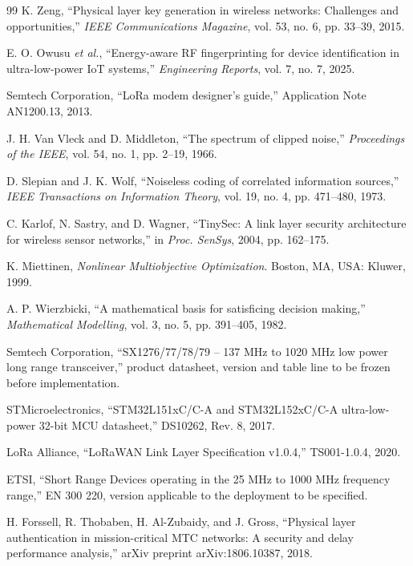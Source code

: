 \documentclass[conference,a4paper]{IEEEtran}
\begin{document}
\begin{thebibliography}{99}
K. Zeng, ``Physical layer key generation in wireless networks: Challenges and opportunities,'' \emph{IEEE Communications Magazine}, vol. 53, no. 6, pp. 33--39, 2015.

E. O. Owusu \emph{et al.}, ``Energy-aware RF fingerprinting for device identification in ultra-low-power IoT systems,'' \emph{Engineering Reports}, vol. 7, no. 7, 2025.

Semtech Corporation, ``LoRa modem designer's guide,'' Application Note AN1200.13, 2013.

J. H. Van Vleck and D. Middleton, ``The spectrum of clipped noise,'' \emph{Proceedings of the IEEE}, vol. 54, no. 1, pp. 2--19, 1966.

D. Slepian and J. K. Wolf, ``Noiseless coding of correlated information sources,'' \emph{IEEE Transactions on Information Theory}, vol. 19, no. 4, pp. 471--480, 1973.

C. Karlof, N. Sastry, and D. Wagner, ``TinySec: A link layer security architecture for wireless sensor networks,'' in \emph{Proc. SenSys}, 2004, pp. 162--175.

K. Miettinen, \emph{Nonlinear Multiobjective Optimization}. Boston, MA, USA: Kluwer, 1999.

A. P. Wierzbicki, ``A mathematical basis for satisficing decision making,'' \emph{Mathematical Modelling}, vol. 3, no. 5, pp. 391--405, 1982.

Semtech Corporation, ``SX1276/77/78/79 -- 137 MHz to 1020 MHz low power long range transceiver,'' product datasheet, version and table line to be frozen before implementation.

STMicroelectronics, ``STM32L151xC/C-A and STM32L152xC/C-A ultra-low-power 32-bit MCU datasheet,'' DS10262, Rev. 8, 2017.

LoRa Alliance, ``LoRaWAN Link Layer Specification v1.0.4,'' TS001-1.0.4, 2020.

ETSI, ``Short Range Devices operating in the 25 MHz to 1000 MHz frequency range,'' EN 300 220, version applicable to the deployment to be specified.


H. Forssell, R. Thobaben, H. Al-Zubaidy, and J. Gross,
``Physical layer authentication in mission-critical MTC networks:
A security and delay performance analysis,''
arXiv preprint arXiv:1806.10387, 2018.


\end{thebibliography}
\end{document}
